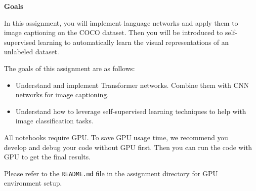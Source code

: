 \textbf{Goals}

In this assignment, you will implement language networks and apply them to image captioning on the COCO dataset. Then you will be introduced to self-supervised learning to automatically learn the visual representations of an unlabeled dataset.

The goals of this assignment are as follows:

\begin{itemize}
    \item Understand and implement Transformer networks. Combine them with CNN networks for image captioning.
    \item Understand how to leverage self-supervised learning techniques to help with image classification tasks.
\end{itemize}

All notebooks require GPU. To save GPU usage time, we recommend you develop and debug your code without GPU first. Then you can run the code with GPU to get the final results.

Please refer to the \texttt{README.md} file in the assignment directory for GPU environment setup.

\newpage